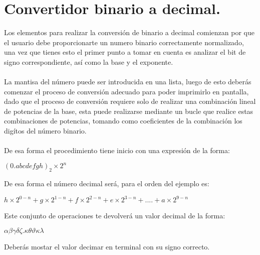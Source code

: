 \documentclass[12pt]{article}
\begin{document}
\section{Convertidor binario a decimal.}
Los elementos para realizar la conversión de binario a decimal comienzan por que el usuario debe proporcionarte un numero binario correctamente normalizado, una vez que tienes esto el primer punto a tomar en cuenta es analizar el bit de signo correspondiente, así como la base y el exponente.
\\
\\
La mantisa del número puede ser introducida en una lista, luego de esto deberás comenzar el proceso de conversión adecuado para poder imprimirlo en pantalla, dado que el proceso de conversión requiere solo de realizar una combinación lineal de potencias de la base, esta puede realizarse mediante un bucle que realice estas combinaciones de potencias, tomando como coeficientes de la combinación los digítos del número binario.
\\
\\
De esa forma el procedimiento tiene inicio con una expresión de la forma: 
\begin{center}
${(0.abcdefgh)_2}\times2^{n}$
\end{center}
De esa forma el número decimal será, para el orden del ejemplo es:
\begin{center}
$h\times2^{0-n}+g\times2^{1-n}+f\times2^{2-n}+e\times2^{3-n}+....+a\times2^{9-n}$
\end{center}
Este conjunto de operaciones te devolverá un valor decimal de la forma:
\begin{center}
$\alpha\beta\gamma\delta\zeta.\kappa\theta\vartheta\kappa\lambda$
\end{center}
Deberás mostar el valor decimar en terminal con su signo correcto.
\end{document}
